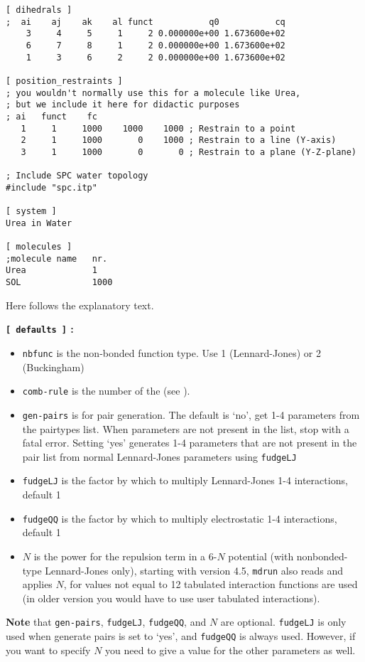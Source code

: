 {\begin{verbatim}
[ dihedrals ]
;  ai    aj    ak    al funct           q0           cq
    3     4     5     1     2 0.000000e+00 1.673600e+02 
    6     7     8     1     2 0.000000e+00 1.673600e+02 
    1     3     6     2     2 0.000000e+00 1.673600e+02 

[ position_restraints ]
; you wouldn't normally use this for a molecule like Urea,
; but we include it here for didactic purposes
; ai   funct    fc
   1     1     1000    1000    1000 ; Restrain to a point
   2     1     1000       0    1000 ; Restrain to a line (Y-axis)
   3     1     1000       0       0 ; Restrain to a plane (Y-Z-plane)

; Include SPC water topology
#include "spc.itp"

[ system ]
Urea in Water

[ molecules ]
;molecule name   nr.
Urea             1
SOL              1000
\end{verbatim}}

Here follows the explanatory text.

{\bf {\tt [~defaults~]} :}
\begin{itemize}
\item {\tt nbfunc} is the non-bonded function type. Use 1 (Lennard-Jones) or 2 (Buckingham)
\item {\tt comb-rule} is the number of the  (see ).
\item {\tt gen-pairs} is for pair generation. The default is `no', {\ie} 
get 1-4 parameters from the pairtypes list. When parameters
are not present in the list, stop with a fatal error.
Setting `yes' generates 1-4 parameters that are not present in the pair list
from normal Lennard-Jones parameters using {\tt fudgeLJ}
\item {\tt fudgeLJ} is the factor by which to multiply Lennard-Jones 1-4 interactions, default 1
\item {\tt fudgeQQ} is the factor by which to multiply electrostatic 1-4 interactions, default 1
\item $N$ is the power for the repulsion term in a 6-$N$ potential (with 
nonbonded-type Lennard-Jones only), starting with {\gromacs} version 4.5,
{\tt mdrun} also reads and applies $N$, for values not equal to 12 tabulated
interaction functions are used
(in older version you would have to use user tabulated interactions).
\end{itemize}
{\bf Note} that {\tt gen-pairs}, {\tt fudgeLJ}, {\tt fudgeQQ}, and $N$ are optional.
{\tt fudgeLJ} is only used when generate pairs is set to `yes', and
{\tt fudgeQQ} is always used. However, if you
want to specify $N$ you need to give a value for the other parameters as well.

